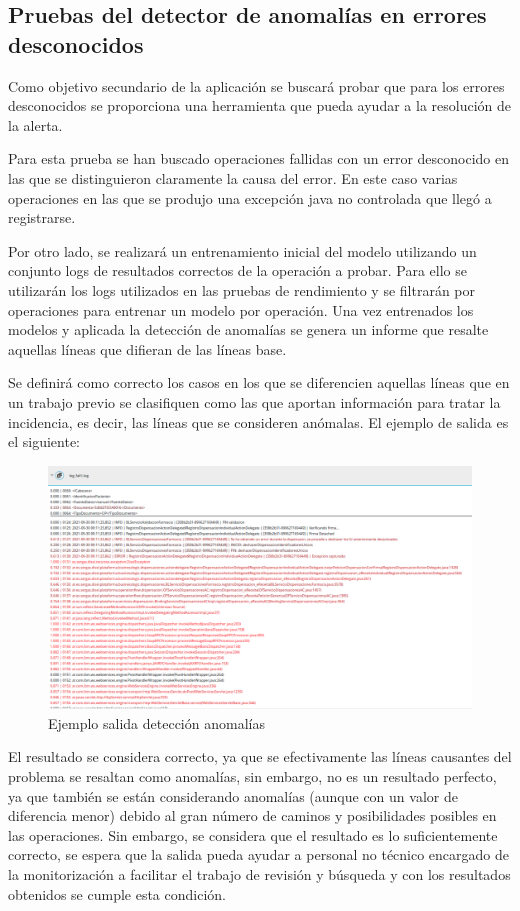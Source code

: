 \subsection{Pruebas del detector de anomalías en errores desconocidos}

Como objetivo secundario de la aplicación se buscará probar que para los errores desconocidos se proporciona una herramienta que pueda ayudar a la resolución de la alerta.

Para esta prueba se han buscado operaciones fallidas con un error desconocido en las que se distinguieron claramente la causa del error. En este caso varias operaciones en las que se produjo una excepción java no controlada que llegó a registrarse.

Por otro lado, se realizará un entrenamiento inicial del modelo utilizando un conjunto logs de resultados correctos de la operación a probar. Para ello se utilizarán los logs utilizados en las pruebas de rendimiento y se filtrarán por operaciones para entrenar un modelo por operación. Una vez entrenados los modelos y aplicada la detección de anomalías se genera un informe que resalte aquellas líneas que difieran de las líneas base. 

Se definirá como correcto los casos en los que se diferencien aquellas líneas que en un trabajo previo se clasifiquen como las que aportan información para tratar la incidencia, es decir, las líneas que se consideren anómalas. El ejemplo de salida es el siguiente:

\begin{figure}[H]
\centerline{\includegraphics[width=15cm]{figuras/report.png}}
\caption{Ejemplo salida detección anomalías}
\label{enlace1}
\end{figure}




El resultado se considera correcto, ya que se efectivamente las líneas causantes del problema se resaltan como anomalías, sin embargo, no es un resultado perfecto, ya que también se están considerando anomalías (aunque con un valor de diferencia menor) debido al gran número de caminos y posibilidades posibles en las operaciones. Sin embargo, se considera que el resultado es lo suficientemente correcto, se espera que la salida pueda ayudar a personal no técnico encargado de la monitorización a facilitar el trabajo de revisión y búsqueda y con los resultados obtenidos se cumple esta condición.


